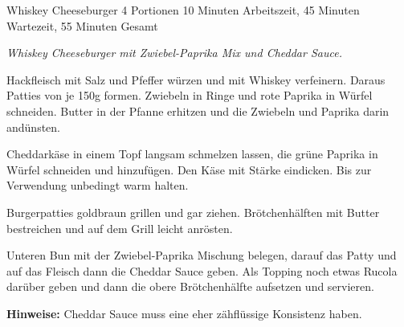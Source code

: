 \begin{recipe}{Whiskey Cheeseburger} {4 Portionen} {10 Minuten Arbeitszeit, 45 Minuten Wartezeit, 55 Minuten Gesamt}

  \freeform
  \textit{Whiskey Cheeseburger mit Zwiebel-Paprika Mix und Cheddar Sauce.}


  Hackfleisch mit Salz und Pfeffer würzen und mit Whiskey verfeinern.
  Daraus Patties von je 150g formen.
  Zwiebeln in Ringe und rote Paprika in Würfel schneiden.
  Butter in der Pfanne erhitzen und die Zwiebeln und Paprika darin andünsten.

  \newstep
  Cheddarkäse in einem Topf langsam schmelzen lassen, die grüne Paprika in Würfel schneiden und hinzufügen.
  Den Käse mit Stärke eindicken. Bis zur Verwendung unbedingt warm halten.

  \newstep
  Burgerpatties goldbraun grillen und gar ziehen.
  Brötchenhälften mit Butter bestreichen und auf dem Grill leicht anrösten.

  \newstep
  Unteren Bun mit der Zwiebel-Paprika Mischung belegen, darauf das Patty und auf das Fleisch dann die Cheddar Sauce geben.
  Als Topping noch etwas Rucola darüber geben und dann die obere Brötchenhälfte aufsetzen und servieren.

  \freeform
  \hrulefill

  \freeform
  \textbf{Hinweise:}
  Cheddar Sauce muss eine eher zähflüssige Konsistenz haben.

\end{recipe}
